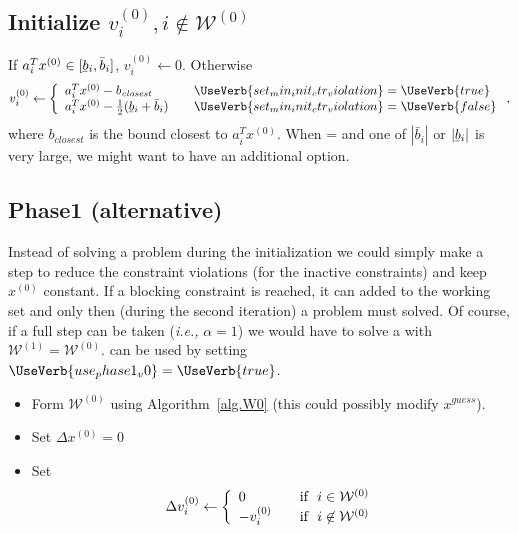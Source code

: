 \documentclass[12pt,a4paper]{article}
\newcommand{\abs}[1]{\left\lvert#1\right\rvert}
\newcommand{\ubar}[1]{\underaccent{\bar}{#1}}
\begin{document}
\subsection{Initialize $v_i^{(0)}, i\not\in\mathcal{W}^{(0)}$} \label{sec.v0_inactive}
%
If $a_i^Tx^{(0)} \in [\ubar{b}_i,\bar{b}_i]$, $v_i^{(0)} \leftarrow 0$. Otherwise
%
\begin{align} \label{eq.v0_inactive}
  v_i^{(0)} \leftarrow \left\{
  \begin{array}{l l}
    a^T_ix^{(0)} - b_{\mathit{closest}} & \quad \UseVerb{set_min_init_ctr_violation} = \UseVerb{true} \\
    a^T_ix^{(0)} - \frac{1}{2}(\ubar{b}_i + \bar{b}_i) & \quad \UseVerb{set_min_init_ctr_violation} = \UseVerb{false}
  \end{array} \right.,
\end{align}
%
where $b_{\mathit{closest}}$ is the bound closest to $a^T_ix^{(0)}$. When
 =  and one of $\abs{\bar{b}_i}$ or
$\abs{\ubar{b}_i}$ is very large, we might want to have an additional option. %

\clearpage

\subsection{Phase1 (alternative)} \label{sec.phase1_v0}

Instead of solving a  problem during the initialization we could simply make a step
to reduce the constraint violations (for the inactive constraints) and keep $x^{(0)}$ constant. If a
blocking constraint is reached, it can added to the working set and only then (during the second
iteration) a  problem must solved. Of course, if a full step can be taken
(\emph{i.e.,} $\alpha = 1$) we would have to solve a  with $\mathcal{W}^{(1)} =
\mathcal{W}^{(0)}$.  can be used by setting {\color{blue}$\UseVerb{use_phase1_v0}
  = \UseVerb{true}$}.
%
\begin{itemize}
\item Form $\mathcal{W}^{(0)}$ using Algorithm~\ref{alg.W0} (this could possibly modify $x^{\mathit{guess}}$).

\item Set $\Delta x^{(0)} = 0$

\item Set
  \begin{align*}
    \Delta v_i^{(0)} \leftarrow \left\{
    \begin{array}{l l}
      0 & \quad \text{if} \,\,\,\, i\in\mathcal{W}^{(0)} \\
      -v_i^{(0)} & \quad \text{if} \,\,\,\, i\not\in\mathcal{W}^{(0)}
    \end{array} \right.
  \end{align*}
\end{itemize}
\end{document}
